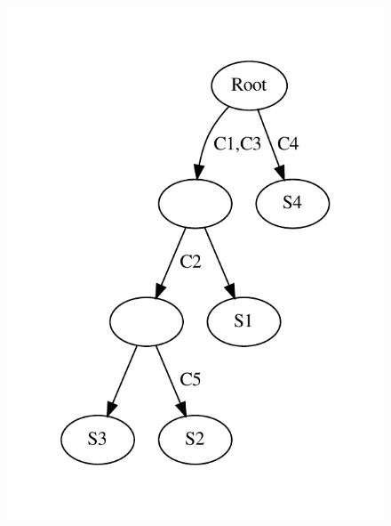 \documentclass[a4paper,12pt, oneside]{book}
\begin{document}
\begin{esempio}
\begin{figure}[H]
    \includegraphics[scale = 0.5]{img/d2.pdf}
  \end{figure}
\end{esempio}
\end{document}
